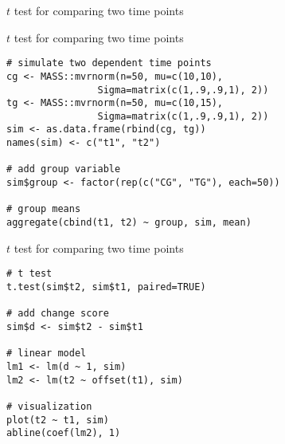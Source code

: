 \documentclass{beamer}
\begin{document}
\begin{frame}{$t$ test for comparing two time points}
\begin{center}
\end{center}
\end{frame}

{

\begin{frame}[fragile]{$t$ test for comparing two time points}
\begin{lstlisting}
# simulate two dependent time points
cg <- MASS::mvrnorm(n=50, mu=c(10,10), 
                Sigma=matrix(c(1,.9,.9,1), 2))
tg <- MASS::mvrnorm(n=50, mu=c(10,15), 
                Sigma=matrix(c(1,.9,.9,1), 2))
sim <- as.data.frame(rbind(cg, tg))
names(sim) <- c("t1", "t2")

# add group variable
sim$group <- factor(rep(c("CG", "TG"), each=50))

# group means
aggregate(cbind(t1, t2) ~ group, sim, mean)
\end{lstlisting}
\end{frame}

\begin{frame}[fragile]{$t$ test for comparing two time points}
\begin{lstlisting}
# t test
t.test(sim$t2, sim$t1, paired=TRUE)

# add change score
sim$d <- sim$t2 - sim$t1

# linear model
lm1 <- lm(d ~ 1, sim)
lm2 <- lm(t2 ~ offset(t1), sim)

# visualization
plot(t2 ~ t1, sim)
abline(coef(lm2), 1)
\end{lstlisting}
\end{frame}

}
\end{document}
